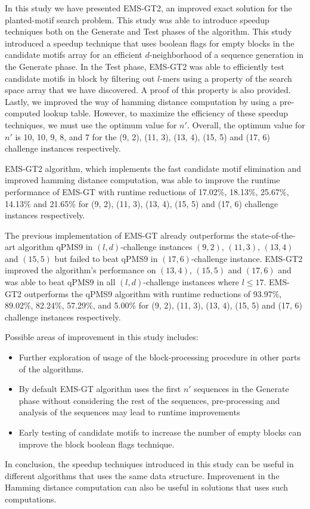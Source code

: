 
In this study we have presented EMS-GT2, an improved exact solution for the planted-motif search problem. This study was able to introduce speedup techniques both on the Generate and Test phases of the algorithm. This study introduced a speedup technique that uses boolean flags for empty blocks in the candidate motifs array for an efficient $d$-neighborhood of a sequence generation in the Generate phase. In the Test phase, EMS-GT2 was able to efficiently test candidate motifs in block by filtering out $l$-mers using a property of the search space array that we have discovered. A proof of this property is also provided. Lastly, we improved the way of hamming distance computation by using a pre-computed lookup table. However, to maximize the efficiency of these speedup techniques, we must use the optimum value for $n'$. Overall, the optimum value for $n'$ is 10, 10, 9, 8, and 7 for the (9, 2), (11, 3), (13, 4), (15, 5) and (17, 6) challenge instances respectively.

EMS-GT2 algorithm, which implements the fast candidate motif elimination and improved hamming distance computation, was able to improve the runtime performance of EMS-GT with runtime reductions of 17.02\%, 18.13\%, 25.67\%, 14.13\% and 21.65\% for (9, 2), (11, 3), (13, 4), (15, 5) and (17, 6) challenge instances respectively.

The previous implementation of EMS-GT already outperforms the state-of-the-art algorithm qPMS9 in $(l, d)$-challenge instances $(9, 2)$, $(11, 3)$, $(13, 4)$ and $(15, 5)$ but failed to beat qPMS9 in $(17, 6)$-challenge instance. EMS-GT2 improved the algorithm's performance on $(13, 4)$, $(15, 5)$ and $(17, 6)$ and was able to beat qPMS9 in all $(l, d)$-challenge instances where $l \leq 17$. EMS-GT2 outperforms the qPMS9 algorithm with runtime reductions of 93.97\%, 89.02\%, 82.24\%, 57.29\%, and 5.00\% for (9, 2), (11, 3), (13, 4), (15, 5) and (17, 6) challenge instances respectively.

Possible areas of improvement in this study includes:

\begin{itemize}

\item Further exploration of usage of the block-processing procedure in other parts of the algorithms.

\item By default EMS-GT algorithm uses the first $n'$ sequences in the Generate phase without considering the rest of the sequences, pre-processing and analysis of the sequences may lead to runtime improvements

\item Early testing of candidate motifs to increase the number of empty blocks can improve the block boolean flags technique. 

\end{itemize}

In conclusion, the speedup techniques introduced in this study can be useful in different algorithms that uses the same data structure. Improvement in the Hamming distance computation can also be useful in solutions that uses such computations.

